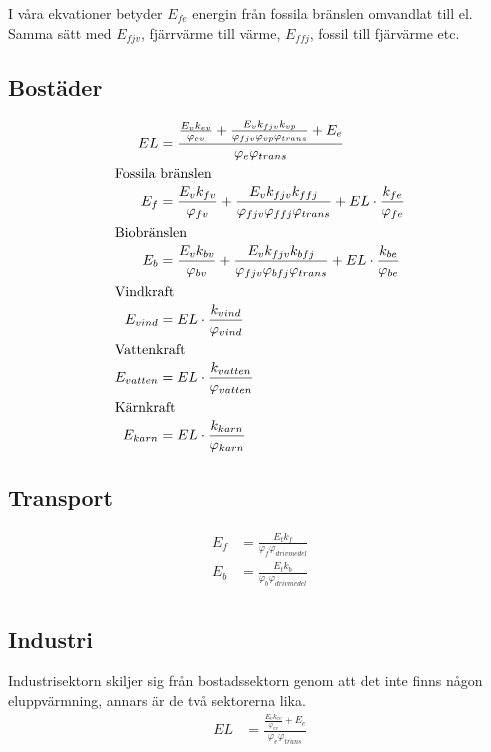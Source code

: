 \documentclass[a4paper,11pt,fleqn, titlepage]{article}
\begin{document}
I våra ekvationer betyder $E_{fe}$ energin från fossila bränslen omvandlat
till el. Samma sätt med $E_{fjv}$, fjärrvärme till värme, $E_{ffj}$, fossil
till fjärvärme etc.

\newpage

\subsection{Bostäder}
\begin{align*}
	EL &= \frac{\frac{E_v k_{ev}}{\varphi_{ev}} + \frac{E_v k_{fjv}
	k_{vp}}{\varphi_{fjv} \varphi_{vp} \varphi_{trans}} +
	E_e}{\varphi_e \varphi_{trans}} \\
\intertext{Fossila bränslen}
	E_f &= \frac{E_v k_{fv}}{\varphi_{fv}} + \frac{E_v k_{fjv}
	k_{ffj}}{\varphi_{fjv} \varphi_{ffj} \varphi_{trans}} + EL
	\cdot \frac{k_{fe}}{\varphi_{fe}} \\
\intertext{Biobränslen}
	E_b &= \frac{E_v k_{bv}}{\varphi_{bv}} + \frac{E_v k_{fjv}
	k_{bfj}}{\varphi_{fjv} \varphi_{bfj} \varphi_{trans}} + EL
	\cdot \frac{k_{be}}{\varphi_{be}} \\
\intertext{Vindkraft}
	E_{vind} &= EL \cdot \frac{k_{vind}}{\varphi_{vind}} \\
\intertext{Vattenkraft}
	E_{vatten} &= EL \cdot \frac{k_{vatten}}{\varphi_{vatten}} \\
\intertext{Kärnkraft}
	E_{karn} &= EL \cdot \frac{k_{karn}}{\varphi_{karn}} \\
\end{align*}


\subsection{Transport}
\begin{align*}
	E_f &= \frac{E_t k_f}{\varphi_f \varphi_{drivmedel}} \\
	E_b &= \frac{E_t k_b}{\varphi_b \varphi_{drivmedel}} \\
\end{align*}


\subsection{Industri}
Industrisektorn skiljer sig från bostadssektorn genom att det inte finns
någon eluppvärmning, annars är de två sektorerna lika.
\begin{align*}
	EL &= \frac{\frac{E_v k_{ev}}{\varphi_{ev}} + E_e}{\varphi_e
	\varphi_{trans}} \\
\end{align*}
\end{document}
